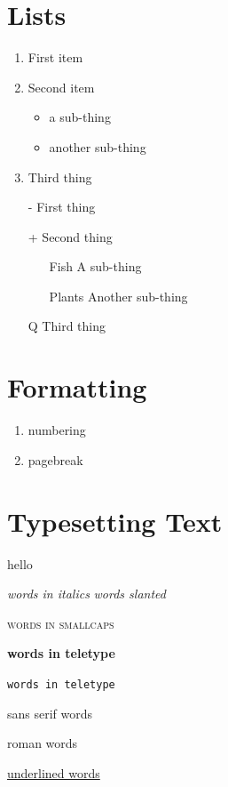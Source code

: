 \documentclass[a4paper,12pt]{article}
\begin{document}
\section{Lists}

\begin{enumerate}
\item First item
\item Second item
\begin{itemize}
\item a sub-thing
\item another sub-thing
\end{itemize}
\item Third thing
\end{enumerate}

\begin{itemize}
\item[-] First thing
\item[+] Second thing
\begin{itemize}
\item[Fish] A sub-thing
\item[Plants] Another sub-thing
\end{itemize}
\item[Q] Third thing
\end{itemize}

\section{Formatting}

\begin{enumerate}
\item numbering
\item pagebreak
\end{enumerate}


\section{Typesetting Text}

hello

\textit{words in italics}
\textsl{words slanted}

\textsc{words in smallcaps}

\textbf{words in teletype}

\texttt{words in teletype}

\textsf{sans serif words}

\textrm{roman words}

\underline{underlined words}
\end{document}
